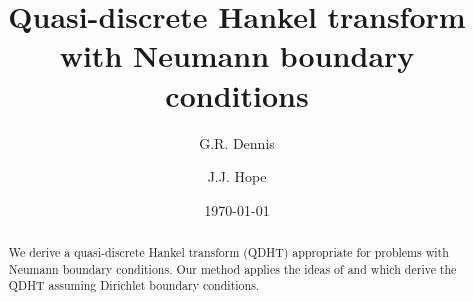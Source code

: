 \documentclass[aip,amsmath,amssymb,reprint,twocolumn]{revtex4-1}
\begin{document}

\title{Quasi-discrete Hankel transform with Neumann boundary conditions} %



\author{G.R. Dennis}

\author{J.J. Hope}


\date{\today}

\begin{abstract}
We derive a quasi-discrete Hankel transform (QDHT) appropriate for problems with Neumann boundary conditions.  Our method applies the ideas of \citet{Yu:1998} and \citet{Guizar-Sicairos:2004} which derive the QDHT assuming Dirichlet boundary conditions.

\end{abstract}

\pacs{}%

\maketitle %

\end{document}
